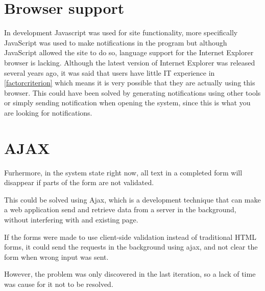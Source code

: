 \section{Browser support}
In development Javascript was used for site functionality, more specifically JavaScript was used to make notifications in the program but although JavaScript allowed the site to do so, language support for the Internet Explorer browser is lacking.
Although the latest version of Internet Explorer was released several years ago, it was said that users have little IT experience in \cref{factorcriterion} which means it is very possible that they are actually using this browser.
This could have been solved by generating notifications using other tools or simply sending notification when opening the system, since this is what you are looking for notifications.

\section{AJAX}

Furhermore, in the system state right now, all text in a completed form will disappear if parts of the form are not validated.

This could be solved using Ajax, which is a development technique that can make a web application send and retrieve data from a server in the background, without interfering with and existing page.

If the forms were made to use client-side validation instead of traditional HTML forms, it could send the requests in the background using ajax, and not clear the form when wrong input was sent.

However, the problem was only discovered in the last iteration, so a lack of time was cause for it not to be resolved.
